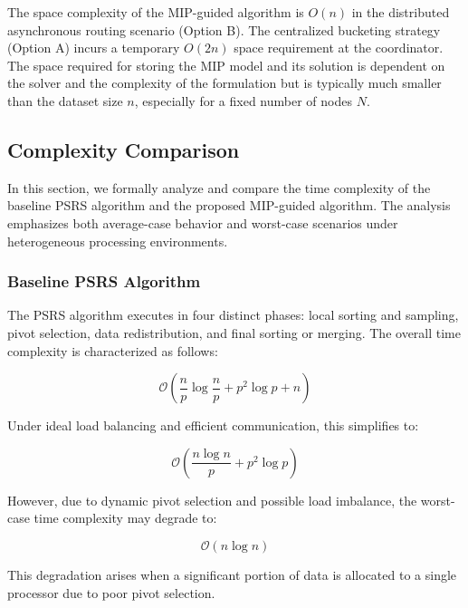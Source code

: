 \documentclass[]{interact}
\theoremstyle{plain}
\theoremstyle{definition}
\theoremstyle{remark}
\begin{document}
The space complexity of the MIP-guided algorithm is $O(n)$ in the distributed asynchronous routing scenario (Option B). The centralized bucketing strategy (Option A) incurs a temporary $O(2n)$ space requirement at the coordinator. The space required for storing the MIP model and its solution is dependent on the solver and the complexity of the formulation but is typically much smaller than the dataset size $n$, especially for a fixed number of nodes $N$.




\subsection{Complexity Comparison}


In this section, we formally analyze and compare the time complexity of the baseline PSRS algorithm and the proposed MIP-guided algorithm. The analysis emphasizes both average-case behavior and worst-case scenarios under heterogeneous processing environments.

\subsubsection{Baseline PSRS Algorithm}

The PSRS algorithm executes in four distinct phases: local sorting and sampling, pivot selection, data redistribution, and final sorting or merging. The overall time complexity is characterized as follows:

\begin{equation}
    \mathcal{O}\left(\frac{n}{p} \log \frac{n}{p} + p^2 \log p + n\right)
\end{equation}

Under ideal load balancing and efficient communication, this simplifies to:

\begin{equation}
    \mathcal{O}\left(\frac{n \log n}{p} + p^2 \log p\right)
\end{equation}

However, due to dynamic pivot selection and possible load imbalance, the worst-case time complexity may degrade to:

\begin{equation}
    \mathcal{O}(n \log n)
\end{equation}

This degradation arises when a significant portion of data is allocated to a single processor due to poor pivot selection.
\end{document}
